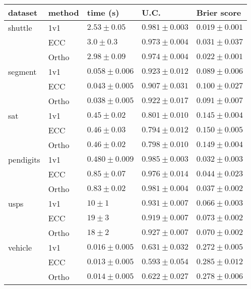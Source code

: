 \begin{tabular}{|ll|lll|}
	\hline
dataset & method & time (s) & U.C. & Brier score \\ \hline
shuttle & 1v1 & $      2.53\pm    0.05$ & $    0.981\pm   0.003$ & $   0.019\pm   0.001$ \\
 & ECC & $       3.0\pm     0.3$ & $    0.973\pm   0.004$ & $   0.031\pm    0.037$ \\
 & Ortho & $      2.98\pm    0.09$ & $    0.974\pm    0.004$ & $   0.022\pm   0.001$\\ \hline
segment & 1v1 & $      0.058\pm   0.006$ & $     0.923\pm    0.012$ & $   0.089\pm   0.006$ \\
 & ECC & $       0.043\pm   0.005$ & $    0.907\pm    0.031$ & $      0.100\pm    0.027$ \\
 & Ortho & $       0.038\pm   0.005$ & $     0.922\pm    0.017$ & $   0.091\pm   0.007$\\ \hline
sat & 1v1 & $      0.45\pm    0.02$ & $     0.801\pm   0.010$ & $     0.145\pm   0.004$ \\
 & ECC & $      0.46\pm    0.03$ & $    0.794\pm    0.012$ & $    0.150\pm   0.005$ \\
 & Ortho & $        0.46\pm    0.02$ & $    0.798\pm     0.010$ & $    0.149\pm   0.004$\\ \hline
pendigits & 1v1 & $      0.480\pm   0.009$ & $    0.985\pm    0.003$ & $   0.032\pm   0.003$ \\
 & ECC & $       0.85\pm    0.07$ & $    0.976\pm    0.014$ & $   0.044\pm    0.023$ \\
 & Ortho & $      0.83\pm    0.02$ & $      0.981\pm   0.004$ & $   0.037\pm   0.002$\\ \hline
usps & 1v1 & $       10\pm      1$ & $    0.931\pm   0.007$ & $   0.066\pm   0.003$ \\
 & ECC & $      19\pm      3$ & $     0.919\pm   0.007$ & $   0.073\pm   0.002$ \\
 & Ortho & $      18\pm        2$ & $    0.927\pm    0.007$ & $   0.070\pm   0.002$\\ \hline
vehicle & 1v1 & $      0.016\pm   0.005$ & $     0.631\pm    0.032$ & $    0.272\pm   0.005$ \\
 & ECC & $       0.013\pm   0.005$ & $     0.593\pm    0.054$ & $    0.285\pm    0.012$ \\
 & Ortho & $       0.014\pm    0.005$ & $    0.622\pm    0.027$ & $    0.278\pm   0.006$\\ \hline
\end{tabular}
